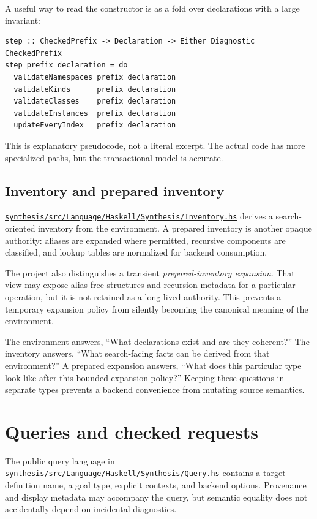 \documentclass[10pt,letterpaper,oneside]{report}
\def\DjexBase{https://github.com/VladimirReshetnikov/Djex/blob/d3d9662598460316bdcd177ce6768c521e764aa8/}
\newcommand{\dpath}[1]{\href{\DjexBase#1}{\nolinkurl{#1}}}
\begin{document}
A useful way to read the constructor is as a fold over declarations with a large invariant:

\begin{lstlisting}[language=Haskellish]
step :: CheckedPrefix -> Declaration -> Either Diagnostic CheckedPrefix
step prefix declaration = do
  validateNamespaces prefix declaration
  validateKinds      prefix declaration
  validateClasses    prefix declaration
  validateInstances  prefix declaration
  updateEveryIndex   prefix declaration
\end{lstlisting}

This is explanatory pseudocode, not a literal excerpt. The actual code has more specialized paths, but the transactional model is accurate.

\subsection{Inventory and prepared inventory}

\dpath{synthesis/src/Language/Haskell/Synthesis/Inventory.hs} derives a search-oriented inventory from the environment. A prepared inventory is another opaque authority: aliases are expanded where permitted, recursive components are classified, and lookup tables are normalized for backend consumption.

The project also distinguishes a transient \emph{prepared-inventory expansion}. That view may expose alias-free structures and recursion metadata for a particular operation, but it is not retained as a long-lived authority. This prevents a temporary expansion policy from silently becoming the canonical meaning of the environment.

\begin{designbox}
The environment answers, ``What declarations exist and are they coherent?'' The inventory answers, ``What search-facing facts can be derived from that environment?'' A prepared expansion answers, ``What does this particular type look like after this bounded expansion policy?'' Keeping these questions in separate types prevents a backend convenience from mutating source semantics.
\end{designbox}

\section{Queries and checked requests}

The public query language in \dpath{synthesis/src/Language/Haskell/Synthesis/Query.hs} contains a target definition name, a goal type, explicit contexts, and backend options. Provenance and display metadata may accompany the query, but semantic equality does not accidentally depend on incidental diagnostics.
\end{document}
